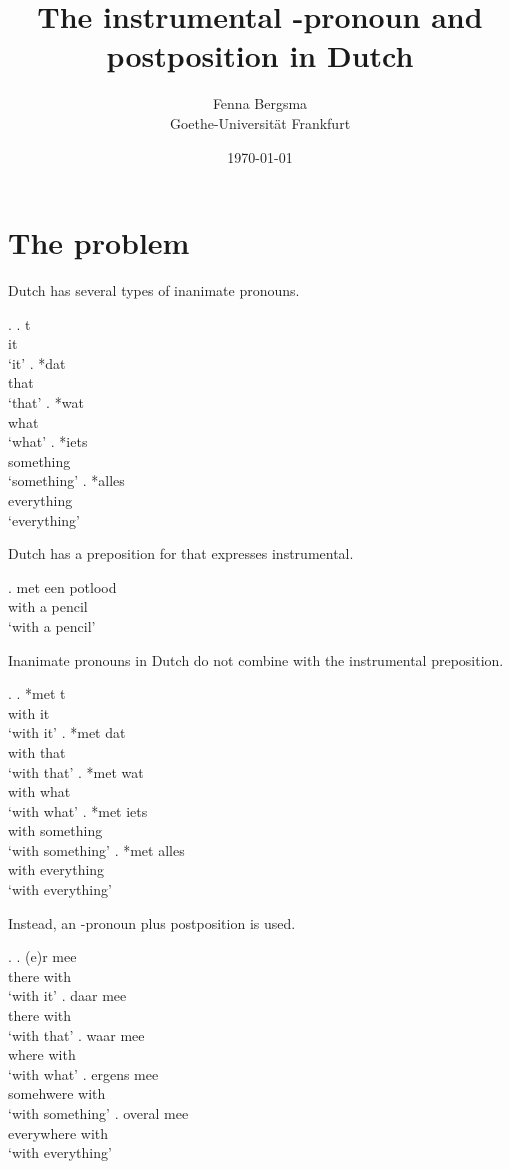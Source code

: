 \documentclass[12pt]{article}
\title{The instrumental \tsc{r}-pronoun and postposition in Dutch}
\author{Fenna Bergsma\\Goethe-Universität Frankfurt}
\date{\today}
\begin{document}
\maketitle

\section{The problem}

Dutch has several types of inanimate pronouns.

\ex.
\ag. t\\
 it\\
 `it'
\bg. *dat\\
 that\\
 `that'
\bg. *wat\\
 what\\
 `what'
\bg. *iets\\
 something\\
 `something'
\bg. *alles\\
 everything\\
 `everything'

Dutch has a preposition for that expresses instrumental.

\exg. met een potlood\\
 with a pencil\\
 `with a pencil'

Inanimate pronouns in Dutch do not combine with the instrumental preposition.

\ex.
\ag. *met t\\
 with it\\
 `with it'
\bg. *met dat\\
 with that\\
 `with that'
\bg. *met wat\\
 with what\\
 `with what'
\bg. *met iets\\
 with something\\
 `with something'
\bg. *met alles\\
 with everything\\
 `with everything'

Instead, an -pronoun plus postposition is used.

\ex.
\ag. (e)r mee\\
 there with\\
 `with it'
\bg. daar mee\\
 there with\\
 `with that'
\bg. waar mee\\
 where with\\
 `with what'
\bg. ergens mee\\
 somehwere with\\
 `with something'
\bg. overal mee\\
 everywhere with\\
 `with everything'
\end{document}
